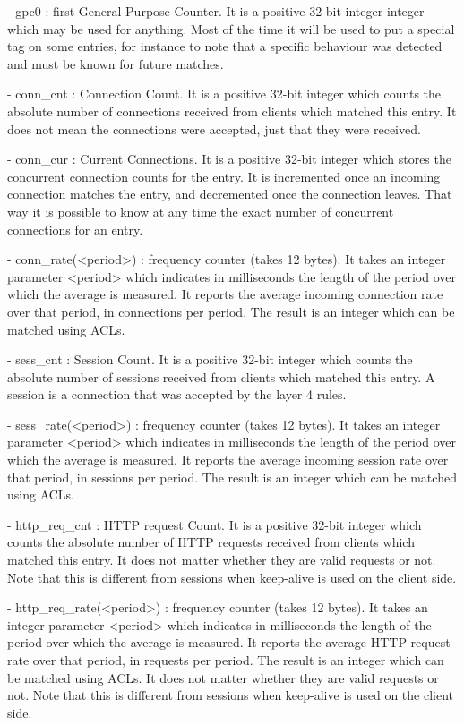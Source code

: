     - gpc0 : first General Purpose Counter. It is a positive 32-bit integer
      integer which may be used for anything. Most of the time it will be used
      to put a special tag on some entries, for instance to note that a
      specific behaviour was detected and must be known for future matches.

    - conn_cnt : Connection Count. It is a positive 32-bit integer which counts
      the absolute number of connections received from clients which matched
      this entry. It does not mean the connections were accepted, just that
      they were received.

    - conn_cur : Current Connections. It is a positive 32-bit integer which
      stores the concurrent connection counts for the entry. It is incremented
      once an incoming connection matches the entry, and decremented once the
      connection leaves. That way it is possible to know at any time the exact
      number of concurrent connections for an entry.

    - conn_rate(<period>) : frequency counter (takes 12 bytes). It takes an
      integer parameter <period> which indicates in milliseconds the length
      of the period over which the average is measured. It reports the average
      incoming connection rate over that period, in connections per period. The
      result is an integer which can be matched using ACLs.

    - sess_cnt : Session Count. It is a positive 32-bit integer which counts
      the absolute number of sessions received from clients which matched this
      entry. A session is a connection that was accepted by the layer 4 rules.

    - sess_rate(<period>) : frequency counter (takes 12 bytes). It takes an
      integer parameter <period> which indicates in milliseconds the length
      of the period over which the average is measured. It reports the average
      incoming session rate over that period, in sessions per period. The
      result is an integer which can be matched using ACLs.

    - http_req_cnt : HTTP request Count. It is a positive 32-bit integer which
      counts the absolute number of HTTP requests received from clients which
      matched this entry. It does not matter whether they are valid requests or
      not. Note that this is different from sessions when keep-alive is used on
      the client side.

    - http_req_rate(<period>) : frequency counter (takes 12 bytes). It takes an
      integer parameter <period> which indicates in milliseconds the length
      of the period over which the average is measured. It reports the average
      HTTP request rate over that period, in requests per period. The result is
      an integer which can be matched using ACLs. It does not matter whether
      they are valid requests or not. Note that this is different from sessions
      when keep-alive is used on the client side.

